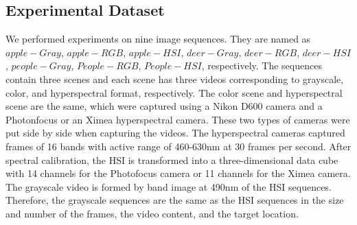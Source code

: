 \documentclass[runningheads,a4paper]{llncs}
\begin{document}
\subsection{Experimental Dataset}
We performed experiments on nine image sequences. They are named as $apple-Gray$, $apple-RGB$, $apple-HSI$, $deer-Gray$, $deer-RGB$, $deer-HSI$, $people-Gray$, $People-RGB$, $People-HSI$, respectively. The sequences contain three scenes and each scene has three videos corresponding to grayscale, color, and hyperspectral format, respectively. The color scene and hyperspectral scene are the same, which were captured using a Nikon D600 camera and a Photonfocus or an Ximea hyperspectral camera. These two types of cameras were put side by side when capturing the videos. The hyperspectral cameras captured frames of 16 bands with active range of 460-630nm at 30 frames per second. After spectral calibration, the HSI is transformed into a three-dimensional data cube with 14 channels for the Photofocus camera or 11 channels for the Ximea camera. The grayscale video is formed by band image at 490nm of the HSI sequences. Therefore, the grayscale sequences are the same as the HSI sequences in the size and number of the frames, the video content, and the target location.

\begin{table}
\caption{Summary of video sequences.}\label{tab1}
\centering
{}
\end{table}
\end{document}
